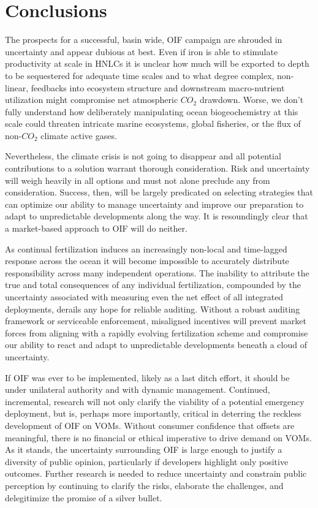 \section{Conclusions}

The prospects for a successful, basin wide, OIF campaign are shrouded in uncertainty and appear dubious at best. Even if iron is able to stimulate productivity at scale in HNLCs it is unclear how much will be exported to depth to be sequestered for adequate time scales and to what degree complex, non-linear, feedbacks into ecosystem structure and downstream macro-nutrient utilization might compromise net atmospheric $CO_2$ drawdown. Worse, we don’t fully understand how deliberately manipulating ocean biogeochemistry at this scale could threaten intricate marine ecosystems, global fisheries, or the flux of non-$CO_2$ climate active gases.

Nevertheless, the climate crisis is not going to disappear and all potential contributions to a solution warrant thorough consideration. Risk and uncertainty will weigh heavily in all options and must not alone preclude any from consideration. Success, then, will be largely predicated on selecting strategies that can optimize our ability to manage uncertainty and improve our preparation to adapt to unpredictable developments along the way. It is resoundingly clear that a market-based approach to OIF will do neither. 

As continual fertilization induces an increasingly non-local and time-lagged response across the ocean it will become impossible to accurately distribute responsibility across many independent operations. The inability to attribute the true and total consequences of any individual fertilization, compounded by the uncertainty associated with measuring even the net effect of all integrated deployments, derails any hope for reliable auditing. Without a robust auditing framework or serviceable enforcement, misaligned incentives will prevent market forces from aligning with a rapidly evolving fertilization scheme and compromise our ability to react and adapt to unpredictable developments beneath a cloud of uncertainty.

If OIF was ever to be implemented, likely as a last ditch effort, it should be under unilateral authority and with dynamic management. Continued, incremental, research will not only clarify the viability of a potential emergency deployment, but is, perhaps more importantly, critical in deterring the reckless development of OIF on VOMs. Without consumer confidence that offsets are meaningful, there is no financial or ethical imperative to drive demand on VOMs. As it stands, the uncertainty surrounding OIF is large enough to justify a diversity of public opinion, particularly if developers highlight only positive outcomes. Further research is needed to reduce uncertainty and constrain public perception by continuing to clarify the risks, elaborate the challenges, and delegitimize the promise of a silver bullet.
